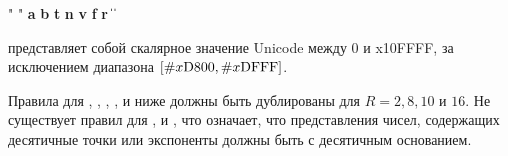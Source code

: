 {\begin{grammar}
 \: "  "
 \: 
 \> \| {\bfseries\backwhack{}a} \| {\bfseries\backwhack{}b} \| {\bfseries\backwhack{}t} \| %
 {\bfseries\backwhack{}n} \| {\bfseries\backwhack{}v} \| {\bfseries\backwhack{}f} \| {\bfseries\backwhack{}r}
 \>  \| {\bfseries\backwhack\doublequote{}} \| {\bfseries\backwhack\backwhack}
 \>  \| {\bfseries\backwhack}
 \>  \hspace*{4em}
 \>  \| 
 \: 
\> \| %
\end{grammar}

}

 представляет собой скалярное значение Unicode
между 0 и \sharpsign{}x10FFFF, за исключением диапазона
$\left[{\tt\#}{}x\textrm{D800}, {\tt\#}{}x\textrm{DFFF}\right]$.

\label{numbersyntax}%
Правила для , , , ,
 и  ниже должны быть дублированы для \hbox{$R = 2, 8, 10$}
и $16$.  Не существует правил для ,  и ,
что означает, что представления чисел, содержащих десятичные точки или экспоненты
должны быть с десятичным основанием.

